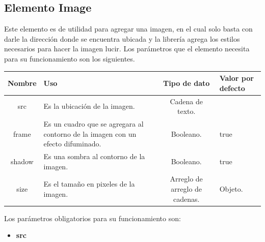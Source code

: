 \clearpage



\subsection{Elemento Image}
Este elemento es de utilidad para agregar una imagen, en el cual solo basta con darle la dirección donde se encuentra ubicada y la librería agrega los estilos necesarios para hacer la imagen lucir.
Los parámetros que el elemento necesita para su funcionamiento son los siguientes.
\newline
    \newline
    \begin{center}
     \begin{tabular}{ | c |  p{5cm}  | c | p{3cm} |} 
     \hline
     \textbf{Nombre} &  \textbf{Uso} &  \textbf{ Tipo de dato} &  \textbf{Valor por defecto}\\ [0.5ex] 
     \hline\hline
     src &  Es la ubicación de la imagen. &   Cadena de texto. & \\  [2.5ex] 
     \hline
     frame &  Es un cuadro que se agregara al contorno de la imagen con un efecto difuminado. &   Booleano. & true \\  [2.5ex] 
     \hline
      shadow &  Es una sombra al contorno de la imagen. &   Booleano. & true \\  [2.5ex] 
     \hline
     size &  Es el tamaño en pixeles de la imagen. &   Arreglo de arreglo de cadenas. & Objeto. \\  [2.5ex] 
     \hline
    \end{tabular}
    \end{center}
    \newline
                \newline
Los parámetros obligatorios para su funcionamiento son:
\begin{itemize}
\item \textbf{src} 
\end{itemize}
\newline
    \newline
